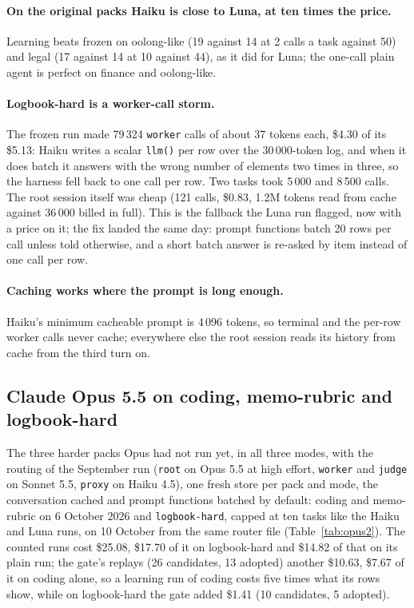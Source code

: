 \documentclass[11pt,a4paper]{article}
\newcommand{\code}[1]{\texttt{#1}}
\begin{document}
\paragraph{On the original packs Haiku is close to Luna, at ten times the
price.} Learning beats frozen on oolong-like (19 against 14 at 2 calls a task
against 50) and legal (17 against 14 at 10 against 44), as it did for Luna;
the one-call plain agent is perfect on finance and oolong-like.

\paragraph{Logbook-hard is a worker-call storm.} The frozen run made 79\,324
\code{worker} calls of about 37 tokens each, \$4.30 of its \$5.13: Haiku
writes a scalar \code{llm()} per row over the 30\,000-token log, and when it
does batch it answers with the wrong number of elements two times in three, so
the harness fell back to one call per row. Two tasks took 5\,000 and 8\,500
calls. The root session itself was cheap (121 calls, \$0.83, 1.2M tokens read
from cache against 36\,000 billed in full). This is the fallback the Luna run
flagged, now with a price on it; the fix landed the same day: prompt
functions batch 20 rows per call unless told otherwise, and a short batch
answer is re-asked by item instead of one call per row.

\paragraph{Caching works where the prompt is long enough.} Haiku's minimum
cacheable prompt is 4\,096 tokens, so terminal and the per-row worker calls
never cache; everywhere else the root session reads its history from cache
from the third turn on.

\FloatBarrier
\subsection{Claude Opus 5.5 on coding, memo-rubric and logbook-hard}
\label{sec:opus2}

The three harder packs Opus had not run yet, in all three modes, with the
routing of the September run (\code{root} on Opus 5.5 at high effort,
\code{worker} and \code{judge} on Sonnet 5.5, \code{proxy} on Haiku 4.5),
one fresh store per pack and mode, the conversation cached and prompt
functions batched by default: coding and memo-rubric on 6 October 2026 and
\code{logbook-hard}, capped at ten tasks like the Haiku and Luna runs, on
10 October from the same router file (Table~\ref{tab:opus2}). The counted
runs cost \$25.08, \$17.70 of it on logbook-hard and \$14.82 of that on its
plain run; the gate's replays (26 candidates, 13 adopted) another \$10.63,
\$7.67 of it on coding alone, so a learning run of coding costs five times
what its rows show, while on logbook-hard the gate added \$1.41 (10
candidates, 5 adopted).
\end{document}
